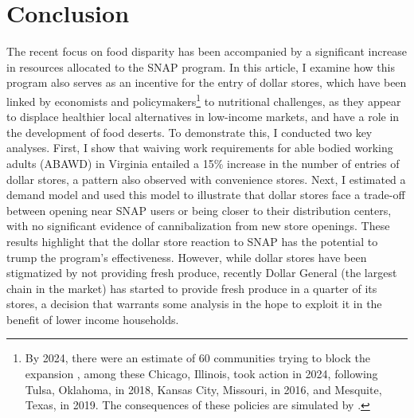 \documentclass[11.5pt]{article}
\begin{document}









\section{Conclusion}

The recent focus on food disparity has been accompanied by a significant increase in resources allocated to the SNAP program. In this article, I examine how this program also serves as an incentive for the entry of dollar stores, which have been linked by economists and policymakers\footnote{By 2024, there were an estimate of 60 communities trying to block the expansion \cite{businessinsider2024dollarstores}, among these Chicago, Illinois, took action in 2024, following Tulsa, Oklahoma, in 2018, Kansas City, Missouri, in 2016, and Mesquite, Texas, in 2019. The consequences of these policies are simulated by \citeauthor{caoui2022impact} \citeyear{caoui2022impact}.} to nutritional challenges, as they appear to displace healthier local alternatives in low-income markets, and have a role in the development of food deserts.  To demonstrate this, I conducted two key analyses.  First, I show that waiving work requirements for able bodied working adults (ABAWD) in Virginia entailed a 15\% increase in the number of entries of dollar stores, a pattern also observed with convenience stores. Next, I estimated a demand model and used this model to illustrate that dollar stores face a trade-off between opening near SNAP users or being closer to their distribution centers, with no significant evidence of cannibalization from new store openings. These results highlight that the dollar store reaction to SNAP has the potential to trump the program's effectiveness. However, while dollar stores have been stigmatized by not providing fresh produce, recently Dollar General (the largest chain in the market) has started to provide fresh produce in a quarter of its stores, a decision that warrants some analysis in the hope to exploit it in the benefit of lower income households. 
\end{document}
